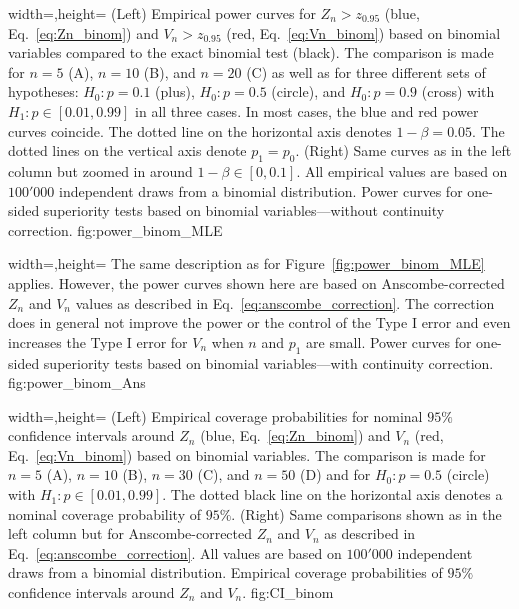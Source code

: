   {width=\textwidth,height=\textheight}%
  {(Left) Empirical power curves for ${Z_n > z_{0.95}}$ (blue, Eq.~\ref{eq:Zn_binom}) and ${V_n > z_{0.95}}$ (red, Eq.~\ref{eq:Vn_binom}) based on binomial variables compared to the exact binomial test (black). The comparison is made for $n=5$ (A), $n=10$ (B), and $n=20$ (C) as well as for three different sets of hypotheses: ${H_0: p=0.1}$ (plus), ${H_0: p=0.5}$ (circle), and ${H_0: p=0.9}$ (cross) with ${H_1: p \in [0.01,0.99]}$ in all three cases. In most cases, the blue and red power curves coincide. The dotted line on the horizontal axis denotes $1-\beta = 0.05$. The dotted lines on the vertical axis denote $p_1 = p_0$. (Right) Same curves as in the left column but zoomed in around $1-\beta \in [0,0.1]$. All empirical values are based on $100'000$ independent draws from a binomial distribution.}%
  {Power curves for one-sided superiority tests based on binomial variables---without continuity correction.}%
  {fig:power_binom_MLE}%
  
  {width=\textwidth,height=\textheight}%
  {The same description as for Figure~\ref{fig:power_binom_MLE} applies. However, the power curves shown here are based on Anscombe-corrected $Z_n$ and $V_n$ values as described in Eq.~\ref{eq:anscombe_correction}. The correction does in general not improve the power or the control of the Type I error and even increases the Type I error for $V_n$ when $n$ and $p_1$ are small.}%
  {Power curves for one-sided superiority tests based on binomial variables---with continuity correction.}%
  {fig:power_binom_Ans}%

  {width=\textwidth,height=\textheight}%
  {(Left) Empirical coverage probabilities for nominal $95\%$ confidence intervals around $Z_n$ (blue, Eq.~\ref{eq:Zn_binom}) and $V_n$ (red, Eq.~\ref{eq:Vn_binom}) based on binomial variables. The comparison is made for $n=5$ (A), $n=10$ (B), $n=30$ (C), and $n=50$ (D) and for ${H_0: p=0.5}$ (circle) with ${H_1: p \in [0.01,0.99]}$. The dotted black line on the horizontal axis denotes a nominal coverage probability of $95\%$. (Right) Same comparisons shown as in the left column but for Anscombe-corrected $Z_n$ and $V_n$ as described in Eq.~\ref{eq:anscombe_correction}. All values are based on $100'000$ independent draws from a binomial distribution.}%
  {Empirical coverage probabilities of $95\%$ confidence intervals around $Z_n$ and $V_n$.}%
  {fig:CI_binom}%

